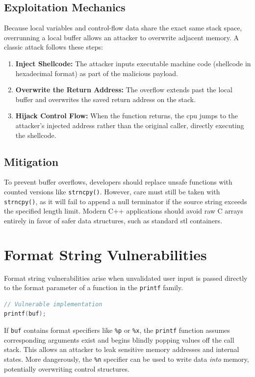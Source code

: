 \subsection{Exploitation Mechanics}
Because local variables and control-flow data share the exact same stack space, overrunning a local buffer allows an attacker to overwrite adjacent memory. A classic attack follows these steps:
\begin{enumerate}
    \item \textbf{Inject Shellcode:} The attacker inputs executable machine code (shellcode in hexadecimal format) as part of the malicious payload.
    \item \textbf{Overwrite the Return Address:} The overflow extends past the local buffer and overwrites the saved return address on the stack.
    \item \textbf{Hijack Control Flow:} When the function returns, the \gls{cpu} jumps to the attacker's injected address rather than the original caller, directly executing the shellcode.
\end{enumerate}

\subsection{Mitigation}
To prevent buffer overflows, developers should replace unsafe functions with counted versions like \texttt{strncpy()}. However, care must still be taken with \texttt{strncpy()}, as it will fail to append a null terminator if the source string exceeds the specified length limit. Modern \textsf{C++} applications should avoid raw \textsf{C} arrays entirely in favor of safer data structures, such as standard \gls{stl} containers.

\section{Format String Vulnerabilities}
Format string vulnerabilities arise when unvalidated user input is passed directly to the format parameter of a function in the \texttt{printf} family.

\begin{lstlisting}[language=C]
// Vulnerable implementation
printf(buf); 
\end{lstlisting}

If \texttt{buf} contains format specifiers like \texttt{\%p} or \texttt{\%x}, the \texttt{printf} function assumes corresponding arguments exist and begins blindly popping values off the call stack. This allows an attacker to leak sensitive memory addresses and internal states. More dangerously, the \texttt{\%n} specifier can be used to write data \textit{into} memory, potentially overwriting control structures. 

